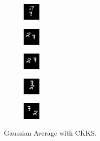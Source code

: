     \begin{subfigure}[t]{0.9\textwidth}
        \centering
        \begin{subfigure}[t]{0.19\textwidth}
            \centering
            \includegraphics[scale=2]{figures/CKKS-GAUSSIAN/frame0}
        \end{subfigure}
        \hfill
        \begin{subfigure}[t]{0.19\textwidth}
            \centering
            \includegraphics[scale=2]{figures/CKKS-GAUSSIAN/frame4}
        \end{subfigure}
        \hfill
        \begin{subfigure}[t]{0.19\textwidth}
            \centering
            \includegraphics[scale=2]{figures/CKKS-GAUSSIAN/frame8}
        \end{subfigure}
        \hfill
        \begin{subfigure}[t]{0.19\textwidth}
            \centering
            \includegraphics[scale=2]{figures/CKKS-GAUSSIAN/frame12}
        \end{subfigure}
        \hfill
        \begin{subfigure}[t]{0.19\textwidth}
            \centering
            \includegraphics[scale=2]{figures/CKKS-GAUSSIAN/frame16}
        \end{subfigure}
        \caption{Gaussian Average with CKKS.}
    \end{subfigure}
    \\ \bigskip
